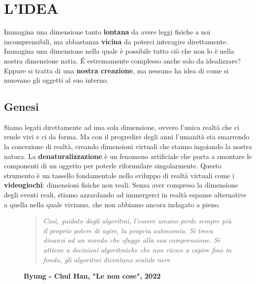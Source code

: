 \section{L'IDEA}
Immagina una dimensione tanto \textbf{lontana} da avere leggi fisiche a noi incomprensibili, ma abbastanza \textbf{vicina} da poterci interagire direttamente. Immagina una dimensione nella quale è possibile tutto ciò che non lo è nella nostra dimensione natia. É estremamente complesso anche solo da idealizzare? Eppure si tratta di una \textbf{nostra creazione}, ma nessuno ha idea di come si muovano gli oggetti al suo interno.
	
	\subsection{Genesi}
	Siamo legati direttamente ad una sola dimensione, ovvero l'unica realtà che ci rende vivi e ci da forma. Ma con il progredire degli anni l'umanità sta smarrendo la concezione di realtà, creando dimensioni virtuali che stanno ingoiando la nostra natura.
	La \textbf{denaturalizzazione} è un fenomeno artificiale che porta a smontare le componenti di un oggetto per poterle riformulare singolarmente. Questo strumento è un tassello fondamentale nello sviluppo di realtà virtuali come i \textbf{videogiochi}: dimensioni fisiche non reali.
	Senza aver compreso la dimensione degli eventi reali, stiamo azzardando ad immergerci in realtà espanse alternative a quella nella quale viviamo, che non abbiamo ancora indagato a pieno.
	
	\begin{figure}[h] %
		\begin{quote}
			\textit{Così, guidato dagli algoritmi, l'essere umano perde sempre più il proprio potere di agire, la propria autonomia. Si trova dinanzi ad un mondo che sfugge alla sua comprensione. Si attiene a decisioni algoritmiche che non riesce a capire fino in fondo, gli algoritmi diventano scatole nere}
		\end{quote}
		\caption{\textbf{Byung - Chul Han, "Le non cose", 2022}}
	\end{figure}
	

